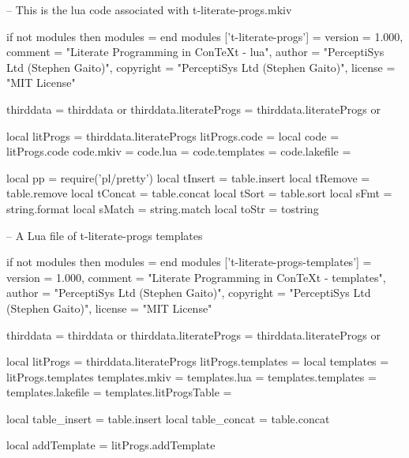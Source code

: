 \stopMkIVCode

\startLuaCode
-- This is the lua code associated with t-literate-progs.mkiv

if not modules then modules = { } end
modules ['t-literate-progs'] = {
    version   = 1.000,
    comment   = "Literate Programming in ConTeXt - lua",
    author    = "PerceptiSys Ltd (Stephen Gaito)",
    copyright = "PerceptiSys Ltd (Stephen Gaito)",
    license   = "MIT License"
}

thirddata               = thirddata               or {}
thirddata.literateProgs = thirddata.literateProgs or {}

local litProgs  = thirddata.literateProgs
litProgs.code   = {}
local code      = litProgs.code
code.mkiv       = {}
code.lua        = {}
code.templates  = {}
code.lakefile   = {}

local pp = require('pl/pretty')
local tInsert = table.insert
local tRemove = table.remove
local tConcat = table.concat
local tSort   = table.sort
local sFmt    = string.format
local sMatch  = string.match
local toStr   = tostring
\stopLuaCode

\startLuaTemplate
-- A Lua file of t-literate-progs templates

if not modules then modules = { } end
modules ['t-literate-progs-templates'] = {
    version   = 1.000,
    comment   = "Literate Programming in ConTeXt - templates",
    author    = "PerceptiSys Ltd (Stephen Gaito)",
    copyright = "PerceptiSys Ltd (Stephen Gaito)",
    license   = "MIT License"
}

thirddata               = thirddata               or {}
thirddata.literateProgs = thirddata.literateProgs or {}

local litProgs          = thirddata.literateProgs
litProgs.templates      = {}
local templates         = litProgs.templates
templates.mkiv          = {}
templates.lua           = {}
templates.templates     = {}
templates.lakefile      = {}
templates.litProgsTable = {}

local table_insert = table.insert
local table_concat = table.concat

local addTemplate = litProgs.addTemplate
\stopLuaTemplate

\stopchapter